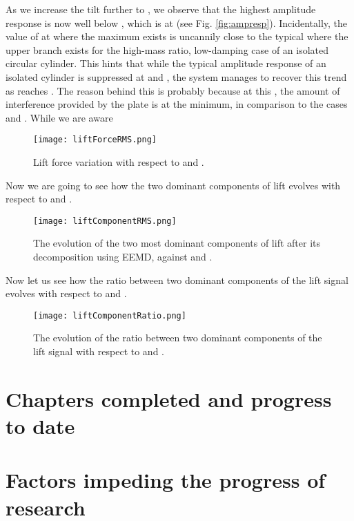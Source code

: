 \documentclass[a4paper]{article}
\begin{document}
As we increase the tilt further to \rtw{}, we observe that the highest amplitude response is now well below \ured{} \es{} \urni{}, which is at \ured{} \es{} \urth{} (see Fig. \ref{fig:ampresp}). Incidentally, the value of \urth{} at where the maximum \yrms{} exists is uncannily close to the typical \ured{} where the upper branch exists for the high-mass ratio, low-damping case of an isolated circular cylinder. This hints that while the typical amplitude response of an isolated cylinder is suppressed at \ptlt{} \rze{} and \ron{}, the system manages to recover this trend as \ptlt{} reaches \rth{}. The reason behind this is probably because at this \ptlt{}, the amount of interference provided by the plate is at the minimum, in comparison to the cases \ptlt{} \es{} \rze{} and \ron{}. While we are aware

\newpage

\begin{figure}[h]
  \centering
  \texttt{[image: liftForceRMS.png]}
  \caption{Lift force variation with respect to \ured{} and \ptlt{}.}
  \label{fig:liftevo}
\end{figure}

Now we are going to see how the two dominant components of lift evolves with respect to \ured{} and \ptlt{}.

\begin{figure}[h]
  \centering
  \texttt{[image: liftComponentRMS.png]}
  \caption{The evolution of the two most dominant components of lift after its decomposition using EEMD, against \ured{} and \ptlt{}.}
  \label{fig:liftcomp}
\end{figure}

Now let us see how the ratio between two dominant components of the lift signal evolves with respect to \ured{} and \ptlt{}.

\begin{figure}[h]
  \centering
  \texttt{[image: liftComponentRatio.png]}
  \caption{The evolution of the ratio between two dominant components of the lift signal with respect to \ured{} and \ptlt{}.}
  \label{fig:liftcomprat}
\end{figure}

\newpage

\section{Chapters completed and progress to date}

\section{Factors impeding the progress of research}

\printbibliography
\end{document}
